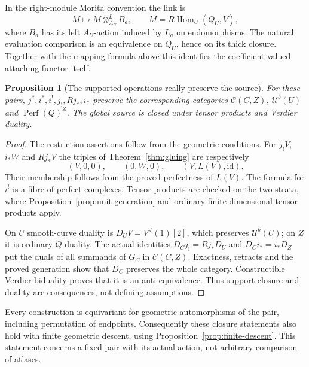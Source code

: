 \documentclass[11pt]{article}
\newtheorem{proposition}[theorem]{Proposition}
\theoremstyle{definition}
\theoremstyle{remark}
\newcommand{\Perf}{\operatorname{Perf}}
\newcommand{\RHom}{R\operatorname{Hom}}
\begin{document}
In the right-module Morita convention the link is
\[
 M\longmapsto M\otimes^L_{A_U}B_a,
 \qquad M=\RHom_U(Q_U,V),
\]
where $B_a$ has its left $A_U$-action induced by $L_a$ on endomorphisms.
The natural evaluation comparison is an equivalence on $Q_U$, hence
on its thick closure.  Together with the mapping formula above this
identifies the coefficient-valued attaching functor itself.

\begin{proposition}[The supported operations really preserve the source]
\label{prop:operations}
For these pairs, $j^*,i^*,i^!,j_!,Rj_*,i_*$ preserve the corresponding
categories $\mathcal C(C,Z)$, $\mathcal U^b(U)$ and $\Perf(Q)^Z$.
The global source is closed under tensor products and Verdier duality.
\end{proposition}
\begin{proof}
The restriction assertions follow from the geometric conditions.
For $j_!V$, $i_*W$ and $Rj_*V$ the triples of
Theorem~\ref{thm:gluing} are respectively
\[
 (V,0,0),\qquad (0,W,0),\qquad (V,L(V),\mathrm{id}).
\]
Their membership follows from the proved perfectness of $L(V)$.
The formula for $i^!$ is a fibre of perfect complexes.  Tensor products
are checked on the two strata, where Proposition~\ref{prop:unit-generation}
and ordinary finite-dimensional tensor products apply.

On $U$ smooth-curve duality is
$D_U V=V^\vee(1)[2]$, which preserves $\mathcal U^b(U)$; on $Z$ it is
ordinary $Q$-duality.  The actual identities
$D_Cj_!=Rj_*D_U$ and $D_Ci_*=i_*D_Z$ put the duals of all summands of
$G_C$ in $\mathcal C(C,Z)$.  Exactness, retracts and the proved generation
show that $D_C$ preserves the whole category.  Constructible Verdier
biduality proves that it is an anti-equivalence.  Thus support closure
and duality are consequences, not defining assumptions.
\end{proof}
Every construction is equivariant for geometric automorphisms of the
pair, including permutation of endpoints.  Consequently these closure
statements also hold with finite geometric descent, using
Proposition~\ref{prop:finite-descent}.  This statement concerns a fixed
pair with its actual action, not arbitrary comparison of atlases.
\end{document}
